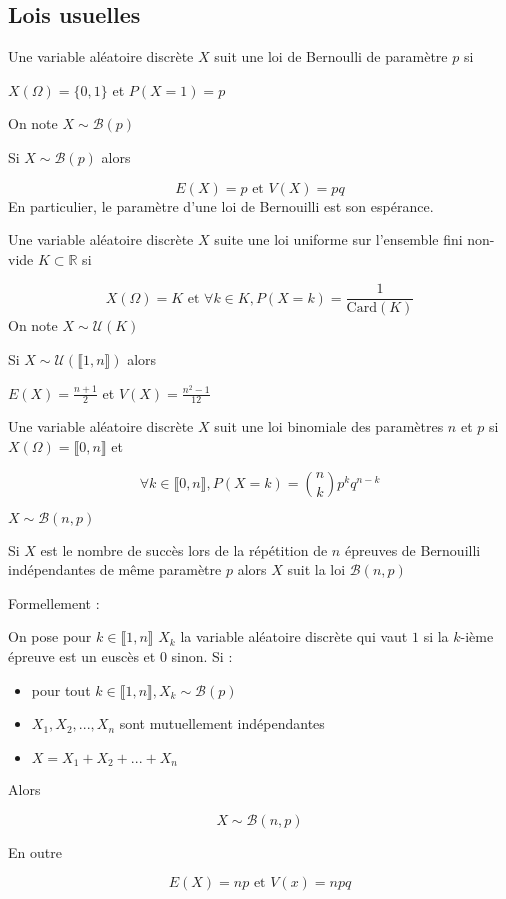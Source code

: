 \documentclass[a4paper,12pt]{book}
\newcommand{\Def}[2]{\begin{tcolorbox}[colback=white,colframe=red!10!green!20!blue!75!, title=Définition : #1]#2\end{tcolorbox}}
\newcommand{\Thr}[2]{\begin{tcolorbox}[sharp corners, colback=white,colframe=red!10!blue!30!green!75!, title=Théorème : #1]#2\end{tcolorbox}}
\def\R{\mathbb{R}}
\begin{document}
\subsection{Lois usuelles}
\Def{}{Une variable aléatoire discrète $X$ suit une loi de Bernoulli de paramètre $p$ si
\par\begin{center}$X(\Omega)=\{0,1\}$ et $P(X=1)=p$\end{center}
\par On note $X\sim\mathcal{B}(p)$}
\Thr{}{Si $X\sim\mathcal{B}(p)$ alors
\par $$E(X)=p\text{ et }V(X)=pq$$
En particulier, le paramètre d'une loi de Bernouilli est son espérance.}

\Def{}{Une variable aléatoire discrète $X$ suite une loi uniforme sur l'ensemble fini non-vide $K\subset \R$ si
\par $$X(\Omega)=K\text{ et }\forall k\in K, P(X=k) = \frac{1}{\mathrm{Card}(K)}$$
On note $X\sim \mathcal{U}(K)$}
\Thr{}{Si $X\sim\mathcal{U}(\llbracket 1,n\rrbracket)$ alors
\par\begin{center}$E(X)=\frac{n+1}{2}$ et $V(X) = \frac{n^2-1}{12}$\end{center}}

\Def{}{Une variable aléatoire discrète $X$ suit une loi binomiale des paramètres $n$ et $p$ si $X(\Omega)=\llbracket 0,n\rrbracket$ et
\par $$\forall k\in \llbracket 0,n\rrbracket, P(X=k)=\binom{n}{k}p^kq^{n-k}$$
\par $X\sim \mathcal{B}(n,p)$}
\Thr{Modèle loi binomiale}{Si $X$ est le nombre de succès lors de la répétition de $n$ épreuves de Bernouilli indépendantes de même paramètre $p$ alors $X$ suit la loi $\mathcal{B}(n,p)$
\par Formellement :
\par On pose pour $k\in\llbracket 1,n\rrbracket$ $X_k$ la variable aléatoire discrète qui vaut $1$ si la $k$-ième épreuve est un euscès et $0$ sinon. Si :\begin{itemize}
\item pour tout $k\in\llbracket 1,n\rrbracket, X_k\sim\mathcal{B}(p)$
\item $X_1,X_2,..., X_n$ sont mutuellement indépendantes
\item $X=X_1+X_2+...+X_n$
\end{itemize}
Alors
\par $$X\sim \mathcal{B}(n,p)$$
\par En outre
\par $$E(X)=np\text{ et }V(x)=npq$$}
\end{document}
